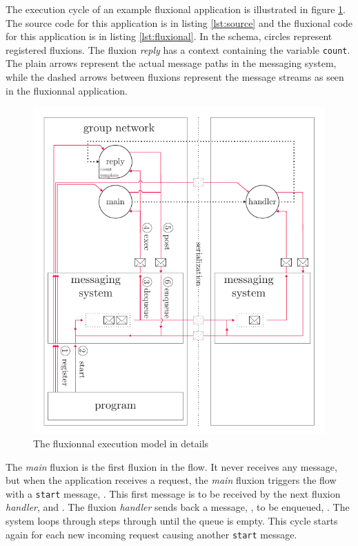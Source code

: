 The execution cycle of an example fluxional application is illustrated in figure \ref{fig:MesSys}. The source code for this application is in listing \ref{lst:source} and the fluxional code for this application is in listing \ref{lst:fluxional}.
In the schema, circles represent registered fluxions.
The fluxion \textit{reply} has a context containing the variable \texttt{count}.
The plain arrows represent the actual message paths in the messaging system, while the dashed arrows between fluxions represent the message streams as seen in the fluxionnal application.

\begin{figure}[h!]
  \includegraphics[width=\linewidth]{ressources/schema-message.pdf}
  \caption{The fluxionnal execution model in details}
  \label{fig:MesSys}
\end{figure}

The \textit{main} fluxion is the first fluxion in the flow.
It never receives any message, but when the application receives a request, the \textit{main} fluxion triggers the flow with a \texttt{start} message, .
This first message is to be received by the next fluxion \textit{handler},  and .
The fluxion \textit{handler} sends back a message, , to be enqueued, .
The system loops through steps  through  until the queue is empty.
This cycle starts again for each new incoming request causing another \texttt{start} message.

